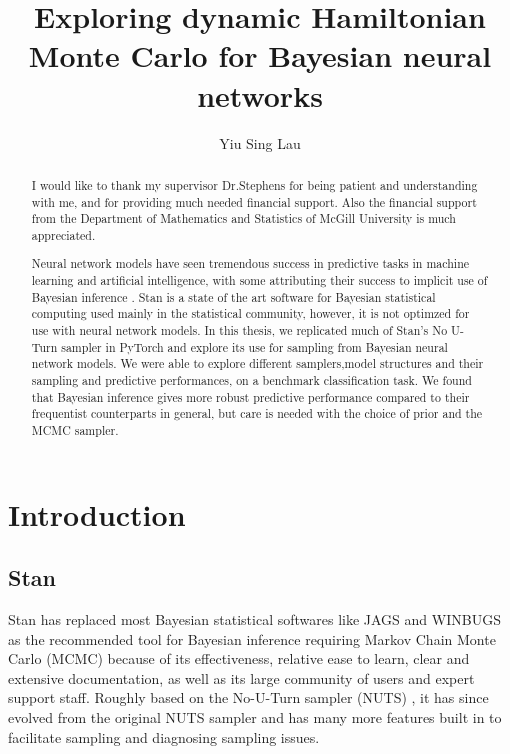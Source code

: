 \documentclass[12pt]{report}
\title{Exploring dynamic Hamiltonian Monte Carlo for Bayesian neural networks}
\author{Yiu Sing Lau}
\date{}
\begin{document}
\maketitle

\renewcommand{\abstractname}{ACKNOWLEDGEMENTS}
\begin{abstract}
I would like to thank my supervisor Dr.Stephens for being patient and understanding with me, and for providing much needed financial support. Also the financial support from the Department of Mathematics and Statistics of McGill University is much appreciated.
\end{abstract}

\renewcommand{\abstractname}{ABSTRACT}

\begin{abstract}
Neural network models have seen tremendous success in predictive tasks in machine learning and artificial intelligence, with some attributing their success to implicit use of Bayesian inference \cite{mandt2017stochastic}. Stan is a state of the art software for Bayesian statistical computing used mainly in the statistical community, however, it is not optimzed for use with neural network models. In this thesis, we replicated much of Stan's No U-Turn sampler in PyTorch and explore its use for sampling from Bayesian neural network models. We were able to explore different samplers,model structures and their sampling and predictive performances, on a benchmark classification task. We found that Bayesian inference gives more robust predictive performance compared to their frequentist counterparts in general, but care is needed with the choice of prior and the MCMC sampler. 

\end{abstract}
\tableofcontents 

\chapter{Introduction}
\section{Stan}

Stan has replaced most Bayesian statistical softwares like JAGS and WINBUGS as the recommended tool for Bayesian inference requiring Markov Chain Monte Carlo (MCMC)  because of its effectiveness, relative ease to learn, clear and extensive documentation, as well as its large community of users and expert support staff. Roughly based on the No-U-Turn sampler (NUTS) \cite{hoffman2014no}, it has since evolved from the original NUTS sampler and has many more features built in to facilitate sampling and diagnosing sampling issues.
\end{document}
